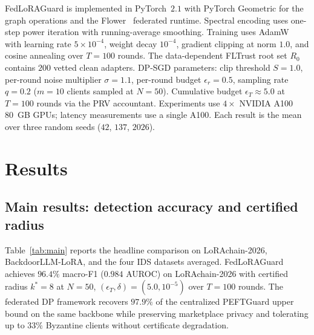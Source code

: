 \documentclass[12pt,a4paper]{article}
\theoremstyle{definition}
\theoremstyle{remark}
\newcommand{\modelname}{FedLoRAGuard}
\newcommand{\benchname}{LoRAchain-2026}
\begin{document}
\modelname{} is implemented in PyTorch~$2.1$ with PyTorch Geometric for the graph operations and the Flower~\cite{beutel2020flower} federated runtime. Spectral encoding uses one-step power iteration with running-average smoothing. Training uses AdamW~\cite{loshchilov2019adamw} with learning rate $5 \times 10^{-4}$, weight decay $10^{-4}$, gradient clipping at norm $1.0$, and cosine annealing over $T = 100$ rounds. The data-dependent FLTrust root set $R_0$ contains $200$ vetted clean adapters. DP-SGD parameters: clip threshold $S = 1.0$, per-round noise multiplier $\sigma = 1.1$, per-round budget $\epsilon_r = 0.5$, sampling rate $q = 0.2$ ($m = 10$ clients sampled at $N = 50$). Cumulative budget $\epsilon_T \approx 5.0$ at $T = 100$ rounds via the PRV accountant. Experiments use $4 \times$ NVIDIA A100 80~GB GPUs; latency measurements use a single A100. Each result is the mean over three random seeds ($42$, $137$, $2026$).


\section{Results}
\label{sec:results}

\subsection{Main results: detection accuracy and certified radius}

Table~\ref{tab:main} reports the headline comparison on \benchname{}, BackdoorLLM-LoRA, and the four IDS datasets averaged. \modelname{} achieves $96.4\%$ macro-F1 ($0.984$ AUROC) on \benchname{} with certified radius $k^* = 8$ at $N = 50$, $(\epsilon_T, \delta) = (5.0, 10^{-5})$ over $T = 100$ rounds. The federated DP framework recovers $97.9\%$ of the centralized PEFTGuard upper bound on the same backbone while preserving marketplace privacy and tolerating up to $33\%$ Byzantine clients without certificate degradation.
\end{document}
